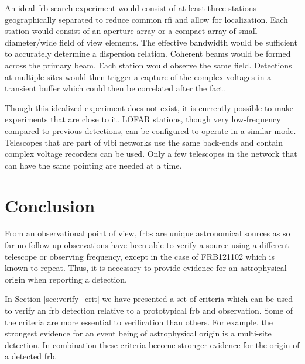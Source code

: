 \documentclass[a4paper,fleqn,usenatbib]{mnras}
\begin{document}
An ideal \gls{frb} search experiment would consist of at least three stations
geographically separated to reduce common \gls{rfi} and allow for localization.
Each station would consist of an aperture array or a compact array of
small-diameter/wide field of view elements. The effective bandwidth would be
sufficient to accurately determine a dispersion relation.  Coherent beams would
be formed across the primary beam. Each station would observe the same field.
Detections at multiple sites would then trigger a capture of the complex
voltages in a transient buffer which could then be correlated after the fact. 

Though this idealized experiment does not exist, it is currently possible to
make experiments that are close to it. LOFAR stations, though very low-frequency
compared to previous detections, can be configured to operate in a similar mode.
Telescopes that are part of \gls{vlbi} networks use the same back-ends and
contain complex voltage recorders can be used. Only a few telescopes in the
network that can have the same pointing are needed at a time.

\section{Conclusion}


From an observational point of view, \glspl{frb} are unique astronomical sources
as so far no follow-up observations have been able to verify a source using a
different telescope or observing frequency, except in the case of FRB121102
which is known to repeat. Thus, it is necessary to provide evidence for an
astrophysical origin when reporting a detection.

In Section \ref{sec:verify_crit} we have presented a set of criteria which can
be used to verify an \gls{frb} detection relative to a prototypical \gls{frb}
and observation. Some of the criteria are more essential to verification than
others.  For example, the strongest evidence for an event being of astrophysical
origin is a multi-site detection.  In combination these criteria become stronger
evidence for the origin of a detected \gls{frb}.
\end{document}
